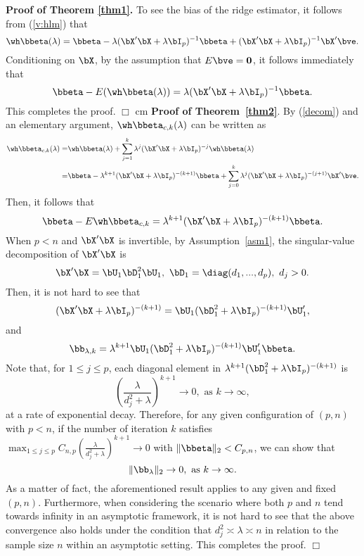 {{ {\bf Proof of Theorem \ref{thm1}.} To see the bias of the ridge estimator, it follows from (\ref{v:hlm}) that
\begin{equation}\label{decom}
    \wh\bbeta(\lambda)=\bbeta-\lambda(\bX'\bX+\lambda\bI_p)^{-1}\bbeta+(\bX'\bX+\lambda\bI_p)^{-1}\bX'\bve.
\end{equation}
Conditioning on $\bX$, by the assumption that $E\bve={\bf 0}$, it follows immediately that
\[\bbeta-E(\wh\bbeta(\lambda))=\lambda(\bX'\bX+\lambda\bI_p)^{-1}\bbeta.\]
This completes the proof. $\Box$
 cm
{\bf Proof of Theorem~\ref{thm2}}. By (\ref{decom}) and an elementary argument, $\wh\bbeta_{c,k}(\lambda)$ can be written as
\begin{align}\label{btck}
   \wh\bbeta_{c,k}(\lambda)=&\wh\bbeta(\lambda)+\sum_{j=1}^{k}\lambda^j(\bX'\bX+\lambda\bI_p)^{-j}\wh\bbeta(\lambda)\notag\\
   =&\bbeta-\lambda^{k+1}(\bX'\bX+\lambda\bI_p)^{-(k+1)}\bbeta+\sum_{j=0}^k\lambda^j(\bX'\bX+\lambda\bI_p)^{-(j+1)}\bX'\bve.
\end{align}
Then, it follows that
\[\bbeta-E\wh\bbeta_{c,k}=\lambda^{k+1}(\bX'\bX+\lambda\bI_p)^{-(k+1)}\bbeta.\]
When $p<n$ and $\bX'\bX$ is invertible, by Assumption~\ref{asm1}, the singular-value decomposition of $\bX'\bX$ is
\[\bX'\bX=\bU_1\bD_1^2\bU_1,\,\,\bD_1=\diag(d_1,...,d_p),\,\, d_j>0.\]
Then, it is not hard to see that
\[(\bX'\bX+\lambda\bI_p)^{-(k+1)}=\bU_1(\bD_1^2+\lambda\bI_p)^{-(k+1)}\bU_1',\]
and
\[\bb_{\lambda,k}=\lambda^{k+1}\bU_1(\bD_1^2+\lambda\bI_p)^{-(k+1)}\bU_1'\bbeta.\]
Note that, for $1\leq j\leq p$, each diagonal element in $\lambda^{k+1}(\bD_1^2+\lambda\bI_p)^{-(k+1)}$ is
\[\left(\frac{\lambda}{d_j^2+\lambda}\right)^{k+1}\rightarrow 0,\,\, \text{as $k\rightarrow\infty$},\]
at a rate of exponential decay. Therefore, for any given configuration of $(p,n)$ with $p<n$, if the number of iteration $k$ satisfies $\max_{1\leq j\leq p}C_{n,p}(\frac{\lambda}{d_j^2+\lambda})^{k+1}\rightarrow 0$ with $\|\bbeta\|_2<C_{p,n}$, we can show that
\[\|\bb_{\lambda}\|_2\rightarrow 0,\,\,\text{as $k\rightarrow\infty$}.\]
As a matter of fact, the aforementioned result applies to any given and fixed $(p, n)$. Furthermore, when considering the scenario where both $p$ and $n$ tend towards infinity in an asymptotic framework, it is not hard to see that the above convergence also holds under the condition that $d_j^2\asymp \lambda \asymp n$ in relation to the sample size $n$ within an asymptotic setting. 
This completes the proof. $\Box$
\vskip 0.6cm

}}
